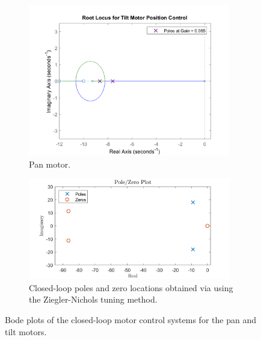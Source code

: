\documentclass[../../main.tex]{subfiles}
\begin{document}
\begin{figure}[h]
\begin{subfigure}{0.48\textwidth}
    \includegraphics[width = 0.97\textwidth]{Sections/System_Design/Images/RL_TiltMotorVelPolePlace.png}
    \caption{Pan motor.}
    \label{fig:vel_root_locus}
\end{subfigure}\quad
\begin{subfigure}{0.48\textwidth}
    \includegraphics[width = 0.97\textwidth]{Sections/System_Design/Images/PoleZero_TiltMotorVel_NZ.png}
    \caption{Closed-loop poles and zero locations obtained via using the Ziegler-Nichols tuning method.}
    \label{fig:ZN_pole_zero}
\end{subfigure}
\caption{Bode plots of the closed-loop motor control systems for the pan and tilt motors.}
\label{fig:vel_poles_zeros}
\end{figure}
\end{document}
